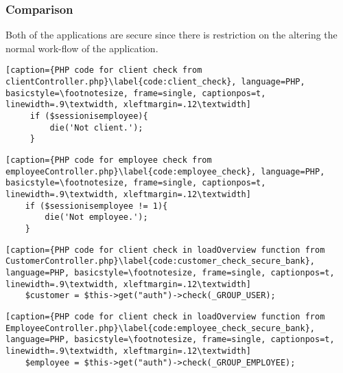\subsubsection{Comparison}
Both of the applications are secure since there is restriction on the altering the normal work-flow of the application.

\begin{lstlisting}[caption={PHP code for client check from clientController.php}\label{code:client_check}, language=PHP, basicstyle=\footnotesize, frame=single, captionpos=t, linewidth=.9\textwidth, xleftmargin=.12\textwidth]
     if ($sessionisemployee){
         die('Not client.');
     }
\end{lstlisting}

\begin{lstlisting}[caption={PHP code for employee check from employeeController.php}\label{code:employee_check}, language=PHP, basicstyle=\footnotesize, frame=single, captionpos=t, linewidth=.9\textwidth, xleftmargin=.12\textwidth]
    if ($sessionisemployee != 1){
        die('Not employee.');
    }
\end{lstlisting}

\begin{lstlisting}[caption={PHP code for client check in loadOverview function from CustomerController.php}\label{code:customer_check_secure_bank}, language=PHP, basicstyle=\footnotesize, frame=single, captionpos=t, linewidth=.9\textwidth, xleftmargin=.12\textwidth]
    $customer = $this->get("auth")->check(_GROUP_USER);
\end{lstlisting}

\begin{lstlisting}[caption={PHP code for client check in loadOverview function from EmployeeController.php}\label{code:employee_check_secure_bank}, language=PHP, basicstyle=\footnotesize, frame=single, captionpos=t, linewidth=.9\textwidth, xleftmargin=.12\textwidth]
    $employee = $this->get("auth")->check(_GROUP_EMPLOYEE);
\end{lstlisting}

\clearpage